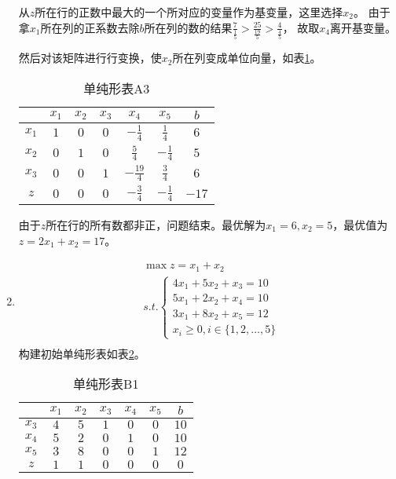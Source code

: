 \begin{solution}
\begin{enumerate}
      从$z$所在行的正数中最大的一个所对应的变量作为基变量，这里选择$x_2$。
      由于拿$x_1$所在列的正系数去除$b$所在列的数的结果$\frac{7}{\frac{1}{5}}>\frac{25}{\frac{19}{5}}>\frac{4}{\frac{4}{5}}$，
      故取$x_{4}$离开基变量。

      然后对该矩阵进行行变换，使$x_2$所在列变成单位向量，如表\ref{ta3}。

      \begin{table}[!h]
         \centering
         \caption{单纯形表A3}
         \label{ta3}
         \begin{tabular}{c|cccccc} 
         \toprule
                &$x_1$  &$x_2$  &$x_3$  &$x_4$  &$x_5$  &$b$   \\\hline
         $x_1$  &$1$    &$0$    &$0$    &$-\frac{1}{4}$    &$\frac{1}{4}$    &$6$   \\
         $x_2$  &$0$    &$1$    &$0$    &$\frac{5}{4}$    &$-\frac{1}{4}$    &$5$   \\
         $x_3$  &$0$    &$0$    &$1$    &$-\frac{19}{4}$    &$\frac{3}{4}$    &$6$   \\
         $z$    &$0$    &$0$    &$0$    &$-\frac{3}{4}$    &$-\frac{1}{4}$    &$-17$   \\
         \bottomrule
         \end{tabular}
      \end{table}

      由于$z$所在行的所有数都非正，问题结束。最优解为$x_1=6,x_2=5$，最优值为$z = 2x_1 + x_2=17$。
      \item 
      \begin{align*}
         &\max z = x_1 + x_2\\
         &s.t. \begin{cases}
            4x_1 + 5x_2 + x_3 = 10\\
            5x_1 + 2x_2 + x_4 = 10\\
            3x_1 + 8x_2 + x_5 = 12\\
            x_i \ge 0, i \in \{1,2,\ldots, 5\}
        \end{cases}\\
      \end{align*}
      构建初始单纯形表如表\ref{tb1}。
      \begin{table}[!h]
         \centering
         \caption{单纯形表B1}
         \label{tb1}
         \begin{tabular}{c|cccccc} 
         \toprule
                &$x_1$  &$x_2$  &$x_3$  &$x_4$  &$x_5$  &$b$   \\\hline
         $x_3$  &$4$    &$5$    &$1$    &$0$    &$0$    &$10$   \\
         $x_4$  &$5$    &$2$    &$0$    &$1$    &$0$    &$10$   \\
         $x_5$  &$3$    &$8$    &$0$    &$0$    &$1$    &$12$   \\
         $z$    &$1$    &$1$    &$0$    &$0$    &$0$    &$0$   \\
         \bottomrule
         \end{tabular}
      \end{table}


\end{enumerate}
\end{solution}
